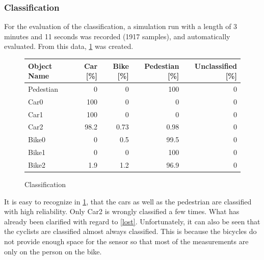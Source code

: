\documentclass[11pt,oneside,openright]{mpreport}
\begin{document}
\subsubsection{Classification}
For the evaluation of the classification, a simulation run with a length of 3 minutes and 11 seconds was recorded (1917 samples), and automatically evaluated. 
From this data, \cref{classification} was created.

\begin{figure}[!htb]
  \caption{Classification} 
  \centering
  \begin{tabularx}{\textwidth}{X|r|r|r|r}
  \hline \textbf{Object Name} & \textbf{Car [\%]} & \textbf{Bike [\%]} & \textbf{Pedestian [\%]} & \textbf{Unclassified [\%]} \\\hline
    Pedestian & 0 & 0 & 100 & 0 \\\hline
    Car0 & 100 & 0 & 0 & 0 \\\hline
    Car1 & 100 & 0 & 0 & 0 \\\hline
    Car2 & 98.2 & 0.73 & 0.98 & 0 \\\hline
    Bike0 & 0 & 0.5 & 99.5 & 0 \\\hline
    Bike1 & 0 & 0 & 100 & 0 \\\hline
    Bike2 & 1.9 & 1.2 & 96.9 & 0 \\
  \end{tabularx}
 \label{classification}
\end{figure}




It is easy to recognize in \cref{classification}, that the cars as well as the pedestrian are classified with high reliability. Only Car2 is wrongly classified a few times.
What has already been clarified with regard to \cref{lost}. Unfortunately, it can also be seen that the cyclists are classified almost always classified. 
This is because the bicycles do not provide enough space for the sensor so that most of the measurements are only on the person on the bike.
\end{document}
